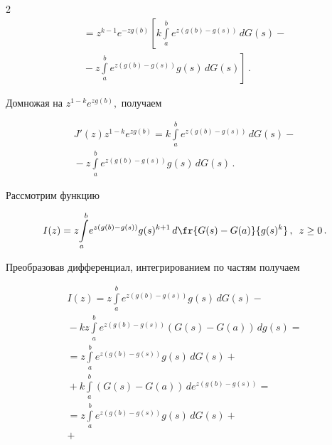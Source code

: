 \begin{multicols}{2}
\begin{multline*}
{}=z^{k-1}e^{-zg(b)}\left[k\int\limits_a^be^{z(g(b)-g(s))}\,dG(s)-{}\right.\\


\left.{}-


z\int\limits_a^b e^{z(g(b)-g(s))}g(s)\,dG(s)\right]\,.


\end{multline*}




Домножая на $z^{1-k}e^{zg(b)},$ получаем


\begin{multline}


J'(z)z^{1-k}e^{zg(b)}=


k\int\limits_a^b{e^{z(g(b)-g(s))}\,dG(s)}-{}\\


{}-z\int\limits_a^b e^{z(g(b)-g(s))}g(s)\,dG(s)\,.


\label{LevChast}


\end{multline}





Рассмотрим функцию


\begin{equation*}


I(z)= z\!\int\limits_a^b \!{e^{z(g(b)-g(s))}g(s)^{k+1}\,


d\fr{G(s)-G(a)}{g(s)^k}}\,,\enskip z\ge0\,.


\end{equation*}


Преобразовав дифференциал, интегрированием по частям получаем


\begin{multline*}


I(z)=z\int\limits_a^b{e^{z(g(b)-g(s))}g(s)\,dG(s)}-{}\\


{}-


kz\int\limits_a^b e^{z(g(b)-g(s))}(G(s)-G(a))\,dg(s)={}\\


{}=z\int\limits_a^b{e^{z(g(b)-g(s))}g(s)\,dG(s)}+{}\\


{}+


k\int\limits_a^b{(G(s)-G(a))\,de^{z(g(b)-g(s))}}={}\\


{}=z\int\limits_a^b{e^{z(g(b)-g(s))}g(s)\,dG(s)}+{}\\


{}+



\end{multline*}
\end{multicols}
